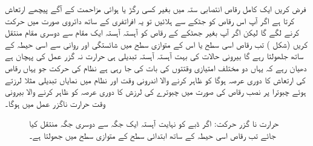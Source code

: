 
فرض کریں ایک کامل   رقاص   انتصابی ستہ میں بغیر کسی رگڑ یا ہوائی مزاحمت کے آگے پیچھے ارتعاش کرتا ہے اگر آپ اس   رقاص   کو جٹکے سے ہلائیں تو یہ افراتفری کے ساتھ دائروی صورت میں حرکت کرنے لگے گا لیکن اگر آپ بغیر جھٹکے کے   رقاص   کو آہستہ آہستہ ایک مقام سے دوسری مقام منتقل کریں (شکل )    تب   رقاص   اسی سطح یا اس کے متوازی سطح میں شائستگی اور روانی سے اسی حیطہ کے ساتھ جلھولتا رہے گا بیرونی حالات کی بہت آہستہ آہستہ تبدیلی ہی حرارت نہ گزر عمل کی پہچان ہے دھیان رہے کہ یہاں دو مختلف امتیازی وقتتوں کی بات کی جا رہی ہے نظام کی حرکت جو یہاں   رقاص   کی ارتعاش کا دوری عرصہ ہوگا کو ظاہر کرنے والا اندرونی وقت  اور نظام میں نمایاں تبدیلی مثلا لرزتے ہوئے چبوترا پر نصب   رقاص   کی صورت میں چبوترے کی لرزش کا دوری عرصہ کو ظاہر کرنے والا بیرونی وقت  حرارت ناگزر عمل میں  ہوگا۔

\begin{figure}
\centering
{}
\caption{حرارت نا گزر حرکت: اگر ڈبے کو نہایت آہستہ ایک جگہ سے دوسری جگہ منتقل کیا جائے تب   رقاص   اسی حیطہ کے ساتھ ابتدائی سطح کے متوازی سطح میں جھولتا ہے۔}
\label{شکل_حرارت_نا_گزر_آہستہ_منتقلی}
\end{figure}


